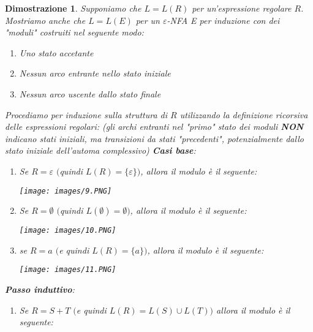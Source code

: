\documentclass[12pt]{article}
\newtheorem{Dimostrazione}{Dimostrazione}[subsection]
\begin{document}
\begin{Dimostrazione}
    Supponiamo che $L = L(R)$ per un'espressione regolare $R$. Mostriamo anche che $L = L(E)$ per un $\varepsilon$-NFA E per induzione con dei "moduli" costruiti nel seguente modo:
    \begin{enumerate}
        \item Uno stato accetante
        \item Nessun arco entrante nello stato iniziale
        \item Nessun arco uscente dallo stato finale
    \end{enumerate}
    Procediamo per induzione sulla struttura di $R$ utilizzando la definizione ricorsiva delle espressioni regolari: (gli archi entranti nel "primo" stato dei moduli \textbf{NON} indicano stati iniziali, ma transizioni da stati "precedenti", potenzialmente dallo stato iniziale dell'automa complessivo) \newline \newline
    \textbf{Casi base}:
    \begin{enumerate}
        \item Se $R = \varepsilon$ $($quindi $L(R) = \{\varepsilon\})$, allora il modulo è il seguente:
            \begin{center}
                \hspace*{-1cm}
                \texttt{[image: images/9.PNG]}
            \end{center}
        \item Se $R = \emptyset$ $($quindi $L(\emptyset) = \emptyset)$, allora il modulo è il seguente:
            \begin{center}
                \hspace*{-1cm}
                \texttt{[image: images/10.PNG]}
            \end{center}
        \item se $R = a$ $($e quindi $L(R) = \{a\})$, allora il modulo è il seguente:
            \begin{center}
                \hspace*{-1cm}
                \texttt{[image: images/11.PNG]}
            \end{center}
    \end{enumerate}
    \textbf{Passo induttivo}:
    \begin{enumerate}
        \item Se $R = S + T$ $($e quindi $L(R) = L(S) \cup L(T))$ allora il modulo è il seguente:

\end{enumerate}
\end{Dimostrazione}
\end{document}

